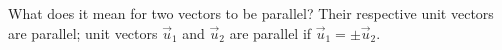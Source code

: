 {What does it mean for two vectors to be parallel?
}
{Their respective unit vectors are parallel; unit vectors $\vec u_1$ and $\vec u_2$ are parallel if $\vec u_1 = \pm \vec u_2$.
}
